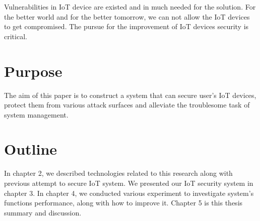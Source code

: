 Vulnerabilities in IoT device are existed and in much needed for the solution. For the better world and for the better tomorrow, we can not allow the IoT devices to get compromised. The pursue for the improvement of IoT devices security is critical.   


\section{Purpose}
The aim of this paper is to construct a system that can secure user's IoT devices, protect them from various attack surfaces and alleviate the troublesome task of system management. 

\section{Outline}
In chapter 2, we described technologies related to this research along with previous attempt to secure IoT system. We presented our IoT security system in chapter 3. In chapter 4, we conducted various experiment to investigate system’s functions performance, along with how to improve it. Chapter 5 is this thesis summary and discussion.  